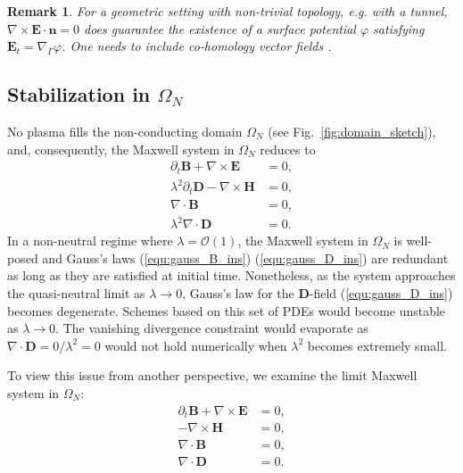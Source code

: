 \documentclass{article}
\newtheorem*{remark}{Remark}
\begin{document}
\begin{remark} For a geometric setting with non-trivial topology, e.g. with a tunnel,
  $\nabla \times \mathbf{E}\cdot\mathbf{n} = 0$ does guarantee the existence of a surface
  potential $\varphi$ satisfying $\mathbf{E}_t = \nabla_\Gamma\varphi$. One needs to
  include co-homology vector fields \cite{Hiptmair_2021}.
\end{remark}

\subsection{Stabilization in $\Omega_{N}$}
\label{sec:reform_continuous}

No plasma fills the non-conducting domain $\Omega_N$ (see Fig.~\ref{fig:domain_sketch}),
and, consequently, the Maxwell system in $\Omega_N$ reduces to 
\begin{subequations}
  \label{eq:mxon}
\begin{align}
    \partial_t \mathbf{B} + \nabla \times \mathbf{E} &= 0, \label{equ:faraday_ins}\\ 
    \lambda^2 \partial_t \mathbf{D} - \nabla \times \mathbf{H} &= 0,  \label{equ:ampere_ins}\\
    \nabla \cdot \mathbf{B} &= 0, \label{equ:gauss_B_ins}\\
    \lambda^2 \nabla \cdot \mathbf{D} &= 0 \label{equ:gauss_D_ins}.
\end{align}
\end{subequations}
In a non-neutral regime where $\lambda = \mathcal{O}(1)$, the Maxwell system in $\Omega_N$
is well-posed and Gauss's laws (\ref{equ:gauss_B_ins}) (\ref{equ:gauss_D_ins}) are
redundant as long as they are satisfied at initial time. Nonetheless, as the system
approaches the quasi-neutral limit as $\lambda \rightarrow 0$, Gauss's law for the
$\mathbf{D}$-field (\ref{equ:gauss_D_ins}) becomes degenerate. Schemes based on this set
of PDEs would become unstable as $\lambda \rightarrow 0$. The vanishing divergence
constraint would evaporate as $\nabla \cdot \mathbf{D} = 0/\lambda^2 = 0$ would not hold
numerically when $\lambda^2$ becomes extremely small.

To view this issue from another perspective, we examine the limit Maxwell system in
$\Omega_N$:
\begin{subequations}
\begin{align}
    \partial_t \mathbf{B} + \nabla \times \mathbf{E} &= 0, \label{equ:faraday_ins_limit}\\ 
    - \nabla \times \mathbf{H} &= 0,  \label{equ:ampere_ins_limit}\\
    \nabla \cdot \mathbf{B} &= 0, \label{equ:gauss_B_ins_limit}\\
    \nabla \cdot \mathbf{D} &= 0 \label{equ:gaus_D_ins_limit}.
\end{align}
\end{subequations}
\end{document}

